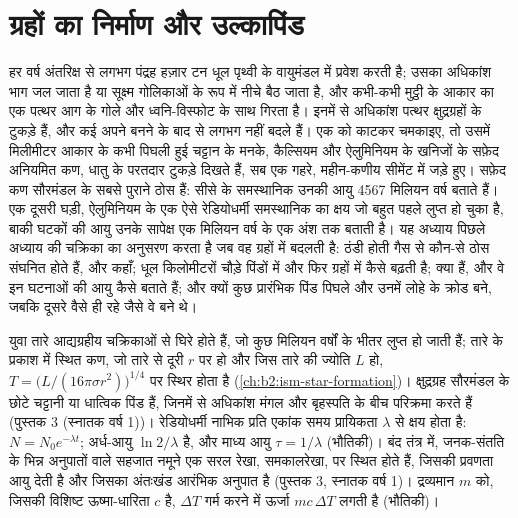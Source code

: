 \chapter{ग्रहों का निर्माण और उल्कापिंड}\label{ch:b2:planet-formation-meteorites}

हर वर्ष अंतरिक्ष से लगभग पंद्रह हज़ार टन धूल पृथ्वी के वायुमंडल में प्रवेश करती है;
उसका अधिकांश भाग जल जाता है या सूक्ष्म गोलिकाओं के रूप में नीचे बैठ जाता है, और कभी-कभी
मुट्ठी के आकार का एक पत्थर आग के गोले और ध्वनि-विस्फोट के साथ गिरता है।
इनमें से अधिकांश पत्थर क्षुद्रग्रहों के टुकड़े हैं, और कई अपने बनने के बाद से
लगभग नहीं बदले हैं। एक को काटकर चमकाइए, तो उसमें मिलीमीटर आकार के
कभी पिघली हुई चट्टान के मनके, कैल्सियम और ऐलुमिनियम के खनिजों के सफ़ेद अनियमित कण,
धातु के परतदार टुकड़े दिखते हैं, सब एक गहरे, महीन-कणीय सीमेंट में जड़े हुए। सफ़ेद
कण सौरमंडल के सबसे पुराने ठोस हैं: सीसे के समस्थानिक उनकी आयु
4567 मिलियन वर्ष बताते हैं। एक दूसरी घड़ी, ऐलुमिनियम के एक ऐसे रेडियोधर्मी समस्थानिक का क्षय
जो बहुत पहले लुप्त हो चुका है, बाकी घटकों की आयु उनके सापेक्ष
एक मिलियन वर्ष के एक अंश तक बताती है। यह अध्याय पिछले अध्याय की चक्रिका का
अनुसरण करता है जब वह ग्रहों में बदलती है: ठंडी होती गैस से कौन-से ठोस संघनित होते हैं,
और कहाँ; धूल किलोमीटरों चौड़े पिंडों में और फिर
ग्रहों में कैसे बढ़ती है;  क्या हैं, और वे इन घटनाओं की आयु कैसे बताते हैं; और क्यों
कुछ प्रारंभिक पिंड पिघले और उनमें लोहे के क्रोड बने, जबकि दूसरे वैसे ही रहे जैसे
वे बने थे।

\begin{recall}
युवा तारे आद्यग्रहीय चक्रिकाओं से घिरे होते हैं, जो कुछ मिलियन वर्षों के भीतर लुप्त
हो जाती हैं; तारे के प्रकाश में स्थित कण, जो तारे से दूरी $r$ पर हो और जिस तारे की
ज्योति $L$ हो, $T = \bigl(L/(16\pi\sigma r^2)\bigr)^{1/4}$ पर स्थिर होता है
(\cref{ch:b2:ism-star-formation})। क्षुद्रग्रह सौरमंडल के छोटे चट्टानी या धात्विक
पिंड हैं, जिनमें से अधिकांश मंगल और बृहस्पति के बीच परिक्रमा करते हैं (पुस्तक 3
(स्नातक वर्ष 1))। रेडियोधर्मी नाभिक प्रति एकांक समय प्रायिकता $\lambda$ से
क्षय होता है: $N = N_0 e^{-\lambda t}$; अर्ध-आयु $\ln 2/\lambda$ है, और माध्य
आयु $\tau = 1/\lambda$ (भौतिकी)। बंद तंत्र में, जनक-संतति के भिन्न अनुपातों वाले
सहजात नमूने एक सरल रेखा, समकालरेखा, पर स्थित होते हैं, जिसकी
प्रवणता आयु देती है और जिसका अंतःखंड आरंभिक अनुपात है (पुस्तक 3, स्नातक वर्ष 1)।
द्रव्यमान $m$ को, जिसकी विशिष्ट ऊष्मा-धारिता $c$ है, $\Delta T$ गर्म करने में ऊर्जा
$mc\,\Delta T$ लगती है (भौतिकी)।
\end{recall}

